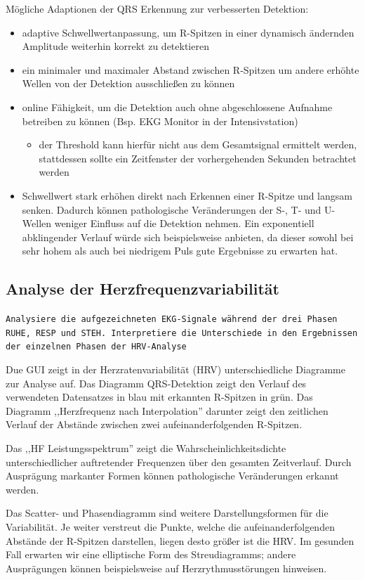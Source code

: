 \documentclass[a4paper,12pt,titlepage]{scrartcl}
\begin{document}
Mögliche Adaptionen der QRS Erkennung zur verbesserten Detektion:
\begin{itemize}
    \item adaptive Schwellwertanpassung, um R-Spitzen in einer dynamisch ändernden Amplitude weiterhin korrekt zu detektieren
    \item ein minimaler und maximaler Abstand zwischen R-Spitzen um andere erhöhte Wellen von der Detektion ausschließen zu können
    \item online Fähigkeit, um die Detektion auch ohne abgeschlossene Aufnahme betreiben zu können (Bsp. EKG Monitor in der Intensivstation)
          \begin{itemize}
              \item der Threshold kann hierfür nicht aus dem Gesamtsignal ermittelt werden, stattdessen sollte ein Zeitfenster der vorhergehenden Sekunden betrachtet werden
          \end{itemize}
    \item Schwellwert stark erhöhen direkt nach Erkennen einer R-Spitze und langsam senken. Dadurch können pathologische Veränderungen der S-, T- und U-Wellen weniger Einfluss auf die Detektion nehmen. Ein exponentiell abklingender Verlauf würde sich beispielsweise anbieten, da dieser sowohl bei sehr hohem als auch bei niedrigem Puls gute Ergebnisse zu erwarten hat.
\end{itemize}

\subsection{Analyse der Herzfrequenzvariabilität}
\texttt{Analysiere die aufgezeichneten EKG-Signale während der drei Phasen RUHE, RESP und STEH. Interpretiere die Unterschiede in den Ergebnissen der einzelnen Phasen der HRV-Analyse}

Due GUI zeigt in der Herzratenvariabilität (HRV) unterschiedliche Diagramme zur Analyse auf. Das Diagramm QRS-Detektion zeigt den Verlauf des verwendeten Datensatzes in blau mit erkannten R-Spitzen in grün.
Das Diagramm ,,Herzfrequenz nach Interpolation'' darunter zeigt den zeitlichen Verlauf der Abstände zwischen zwei aufeinanderfolgenden R-Spitzen.

Das ,,HF Leistungsspektrum'' zeigt die Wahrscheinlichkeitsdichte unterschiedlicher auftretender Frequenzen über den gesamten Zeitverlauf. Durch Ausprägung markanter Formen können pathologische Veränderungen erkannt werden.

Das Scatter- und Phasendiagramm sind weitere Darstellungsformen für die Variabilität. Je weiter verstreut die Punkte, welche die aufeinanderfolgenden Abstände der R-Spitzen darstellen, liegen desto größer ist die HRV. Im gesunden Fall erwarten wir eine elliptische Form des Streudiagramms; andere Ausprägungen können beispielsweise auf Herzrythmusstörungen hinweisen.
\end{document}
